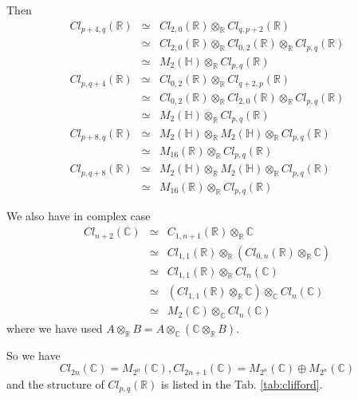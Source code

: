 \documentclass[12pt]{book}
\begin{document}
	Then
	\begin{eqnarray}
		Cl_{p+4,q}(\mathbb R)&\simeq&Cl_{2,0}(\mathbb R)\otimes_{\mathbb R}Cl_{q,p+2}(\mathbb R)\\
		&\simeq&Cl_{2,0}(\mathbb R)\otimes_{\mathbb R}Cl_{0,2}(\mathbb R)\otimes_{\mathbb R}Cl_{p,q}(\mathbb R)\\
		&\simeq&M_2(\mathbb H)\otimes_{\mathbb R}Cl_{p,q}(\mathbb R)\\
		Cl_{p,q+4}(\mathbb R)&\simeq&Cl_{0,2}(\mathbb R)\otimes_{\mathbb R}Cl_{q+2,p}(\mathbb R)\\
		&\simeq&Cl_{0,2}(\mathbb R)\otimes_{\mathbb R}Cl_{2,0}(\mathbb R)\otimes_{\mathbb R}Cl_{p,q}(\mathbb R)\\
		&\simeq&M_2(\mathbb H)\otimes_{\mathbb R}Cl_{p,q}(\mathbb R)\\
		Cl_{p+8,q}(\mathbb R)&\simeq&M_2(\mathbb H)\otimes_{\mathbb R}M_2(\mathbb H)\otimes_{\mathbb R}Cl_{p,q}(\mathbb R)\\
		&\simeq&M_{16}(\mathbb R)\otimes_{\mathbb R}Cl_{p,q}(\mathbb R)\\
		Cl_{p,q+8}(\mathbb R)&\simeq&M_2(\mathbb H)\otimes_{\mathbb R}M_2(\mathbb H)\otimes_{\mathbb R}Cl_{p,q}(\mathbb R)\\
		&\simeq&M_{16}(\mathbb R)\otimes_{\mathbb R}Cl_{p,q}(\mathbb R)
	\end{eqnarray}
	
	We also have in complex case
	\begin{eqnarray}
		Cl_{n+2}(\mathbb C)&\simeq&C_{1,n+1}(\mathbb R)\otimes_{\mathbb R}\mathbb C\\
		&\simeq&Cl_{1,1}(\mathbb R)\otimes_{\mathbb R}(Cl_{0,n}(\mathbb R)\otimes_{\mathbb R}\mathbb C)\\
		&\simeq&Cl_{1,1}(\mathbb R)\otimes_{\mathbb R}Cl_n(\mathbb C)\\
		&\simeq&(Cl_{1,1}(\mathbb R)\otimes_{\mathbb R}\mathbb C)\otimes_{\mathbb C}Cl_n(\mathbb C)\\
		&\simeq& M_2(\mathbb C)\otimes_{\mathbb C}Cl_n(\mathbb C)
	\end{eqnarray}
	where we have used $A\otimes_{\mathbb R}B=A\otimes_{\mathbb C}(\mathbb C\otimes_{\mathbb R} B)$.
	
	So we have 
	\begin{equation}
		Cl_{2n}(\mathbb C)=M_{2^n}(\mathbb C),Cl_{2n+1}(\mathbb C)=M_{2^n}(\mathbb C)\oplus M_{2^n}(\mathbb C)
	\end{equation}
	and the structure of $Cl_{p,q}(\mathbb R)$ is listed in the Tab. \ref{tab:clifford}.
	
\end{document}
